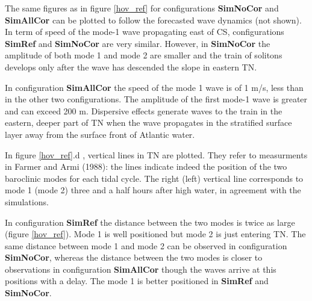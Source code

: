 \documentclass[a4paper,12pt]{article}
\begin{document}
The same figures as in figure \ref{hov_ref} for configurations \textbf{SimNoCor} and \textbf{SimAllCor} can be plotted to follow the forecasted wave dynamics (not shown). In term of speed of the mode-1 wave propagating east of CS, configurations \textbf{SimRef} and \textbf{SimNoCor} are very similar. However, in \textbf{SimNoCor} the amplitude of both mode 1 and mode 2 are smaller and the train of solitons develops only after the wave has descended the slope in eastern TN.

In configuration \textbf{SimAllCor} the speed of the mode 1 wave is of 1 m/s, less than in the other two configurations. The amplitude of the first mode-1 wave is greater and can exceed 200 m. Dispersive effects generate waves to the train in the eastern, deeper part of TN when the wave propagates in the stratified surface layer away from the surface front of Atlantic water.


In figure \ref{hov_ref}.d %
, vertical lines in TN are plotted. They refer to measurments in Farmer and Armi (1988): the lines indicate indeed the position of the two baroclinic modes for each tidal cycle. The right (left) vertical line corresponds to mode 1 (mode 2) three and a half hours after high water, in agreement with the simulations.

In configuration \textbf{SimRef} the distance between the two modes is twice as large (figure \ref{hov_ref}). Mode 1 is well positioned but mode 2 is just entering TN. The same distance between mode 1 and mode 2 can be observed in configuration \textbf{SimNoCor}, whereas the distance between the two modes is closer to observations in configuration \textbf{SimAllCor} though the waves arrive at this positions with a delay. The mode 1 is better positioned in \textbf{SimRef} and \textbf{SimNoCor}.
\end{document}
